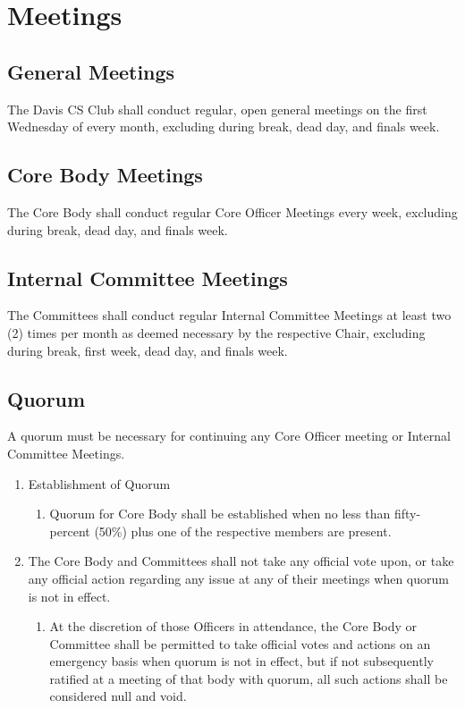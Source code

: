 \documentclass{article}
\newenvironment{li}{
\begin{enumerate}
  \setlength{\itemsep}{1pt}
  \setlength{\parskip}{0pt}
  \setlength{\parsep}{0pt}
}{\end{enumerate}}
\begin{document}
\section{Meetings}

\subsection{General Meetings}
The Davis CS Club shall conduct regular, open general meetings on the first Wednesday of every month, excluding during break, dead day, and finals week.

\subsection{Core Body Meetings}
The Core Body shall conduct regular Core Officer Meetings every week, excluding during break, dead day, and finals week.

\subsection{Internal Committee Meetings}
The Committees shall conduct regular Internal Committee Meetings at least two (2) times per month as deemed necessary by the respective Chair, excluding during break, first week, dead day, and finals week.


\subsection{Quorum}
A quorum must be necessary for continuing any Core Officer meeting or Internal Committee Meetings.
\begin{li}
\item Establishment of Quorum
	\begin{li}
	\item Quorum for Core Body shall be established when no less than fifty-percent (50\%) plus one of the respective members are present.
	\end{li}
\item The Core Body and Committees shall not take any official vote upon, or take any official action regarding any issue at any of their meetings when quorum is not in effect.
	\begin{li}
	\item At the discretion of those Officers in attendance, the Core Body or Committee shall be permitted to take official votes and actions on an emergency basis when quorum is not in effect, but if not subsequently ratified at a meeting of that body with quorum, all such actions shall be considered null and void.
	\end{li}
\end{li}
\end{document}
